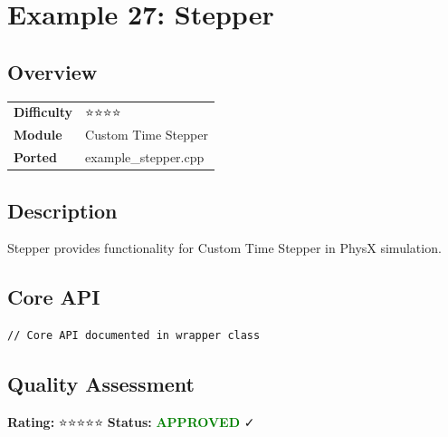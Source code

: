 \section{Example 27: Stepper}
\subsection{Overview}
\begin{table}[h]
\centering
\begin{tabular}{|l|l|}
\hline
\textbf{Difficulty} & ⭐⭐⭐⭐ \\
\textbf{Module} & Custom Time Stepper \\
\textbf{Ported} & example\_stepper.cpp \\
\hline
\end{tabular}
\end{table}

\subsection{Description}
Stepper provides functionality for Custom Time Stepper in PhysX simulation.

\subsection{Core API}
\begin{lstlisting}
// Core API documented in wrapper class
\end{lstlisting}

\subsection{Quality Assessment}
\textbf{Rating:} ⭐⭐⭐⭐⭐ \quad \textbf{Status:} \textcolor{green}{\textbf{APPROVED}} ✓
